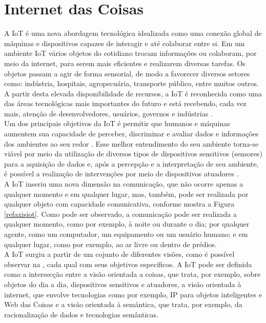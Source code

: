 \section{Internet das Coisas}%
\label{sec:internetofthings}
\quad
A \acrlong{IoT} é uma nova abordagem tecnológica idealizada como uma conexão global
de máquinas e dispositivos capazes de interagir e até colaborar entre si. Em um ambiente \acrshort{IoT} vários objetos do cotidiano trocam informações
ou colaboram, por meio da internet, para serem mais eficientes e realizarem diversas tarefas.
Os objetos passam a agir de forma sensorial, de modo a favorecer diversos setores como:
indústria, hospitais, agropecuária, transporte público, entre muitos outros. A partir desta
elevada disponibilidade de recursos, a \acrshort{IoT} é reconhecida como uma das áreas tecnológicas mais importantes
do futuro e está recebendo, cada vez mais, atenção de desenvolvedores, usuários, governos e indústrias \cite{giusto}.
\\ \null
\quad
Um dos principais objetivos da \acrlong{IoT} é permitir
que humanos e máquinas aumentem sua capacidade de perceber, discriminar e avaliar dados e informações dos ambientes ao seu redor \cite{IOTS}.
 Esse melhor entendimento do seu ambiente torna-se viável por meio da utilização
 de diversos tipos de dispositivos sensitivos (sensores) para a aquisição de dados e, após a percepção e a interpretação
 de seu ambiente, é possível a realização de intervenções por meio de dispositivos atuadores \cite{IOTV}.  \\\null
 \quad A \acrshort{IoT}
 inseriu uma nova dimensão na comunicação, que não ocorre apenas a qualquer momento e em qualquer lugar, mas, também, pode ser realizada por qualquer objeto
 com capacidade comunicativa, conforme mostra a Figura \ref{refaxisiot}. Como pode ser observado, a comunicação pode ser realizada a qualquer momento, como por exemplo, à noite ou durante o dia; por qualquer agente, como um computador, um equipamento ou um usuário humano; e em qualquer lugar, como por exemplo, ao ar livre ou dentro de prédios.
\\ \null
 \quad
 A \acrlong{IoT} surgiu a partir de um cojunto de diferentes visões, como é possível observar na  , cada qual com seus objetivos específicos. A \acrshort{IoT} pode ser definida como a intersecção entre a visão orientada a coisas, que trata, por exemplo, sobre objetos do dia a dia, dispositivos sensitivos e atuadores, a visão orientada à internet, que envolve tecnologias como por exemplo, IP para objetos inteligentes e Web das Coisas e a visão orientada à semântica, que trata, por exemplo, da racionalização de dados e tecnologias semânticas.
 \pagebreak
